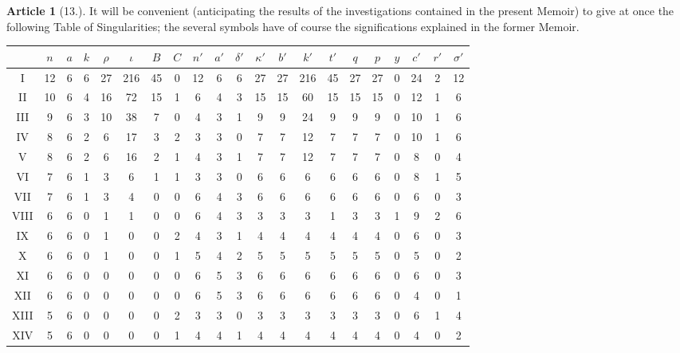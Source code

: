 \documentclass[11pt,a4paper]{article}
\theoremstyle{definition}
\newtheorem{art}{Article}
\begin{document}
\begin{art}[13.]
It will be convenient (anticipating the results of the investigations contained in the present Memoir) to give at once the following Table of Singularities; the several symbols have of course the significations explained in the former Memoir.

\begin{center}
\small
\begin{tabular}{|c|c|c|c|c|c|c|c|c|c|c|c|c|c|c|c|c|c|c|c|c|}
\hline
 & $n$ & $a$ & $k$ & $\rho$ & $\iota$ & $B$ & $C$ & $n'$ & $a'$ & $\delta'$ & $\kappa'$ & $b'$ & $k'$ & $t'$ & $q$ & $p$ & $y$ & $c'$ & $r'$ & $\sigma'$ \\
\hline
I & 12 & 6 & 6 & 27 & 216 & 45 & 0 & 12 & 6 & 6 & 27 & 27 & 216 & 45 & 27 & 27 & 0 & 24 & 2 & 12 \\
\hline
II & 10 & 6 & 4 & 16 & 72 & 15 & 1 & 6 & 4 & 3 & 15 & 15 & 60 & 15 & 15 & 15 & 0 & 12 & 1 & 6 \\
\hline
III & 9 & 6 & 3 & 10 & 38 & 7 & 0 & 4 & 3 & 1 & 9 & 9 & 24 & 9 & 9 & 9 & 0 & 10 & 1 & 6 \\
\hline
IV & 8 & 6 & 2 & 6 & 17 & 3 & 2 & 3 & 3 & 0 & 7 & 7 & 12 & 7 & 7 & 7 & 0 & 10 & 1 & 6 \\
\hline
V & 8 & 6 & 2 & 6 & 16 & 2 & 1 & 4 & 3 & 1 & 7 & 7 & 12 & 7 & 7 & 7 & 0 & 8 & 0 & 4 \\
\hline
VI & 7 & 6 & 1 & 3 & 6 & 1 & 1 & 3 & 3 & 0 & 6 & 6 & 6 & 6 & 6 & 6 & 0 & 8 & 1 & 5 \\
\hline
VII & 7 & 6 & 1 & 3 & 4 & 0 & 0 & 6 & 4 & 3 & 6 & 6 & 6 & 6 & 6 & 6 & 0 & 6 & 0 & 3 \\
\hline
VIII & 6 & 6 & 0 & 1 & 1 & 0 & 0 & 6 & 4 & 3 & 3 & 3 & 3 & 1 & 3 & 3 & 1 & 9 & 2 & 6 \\
\hline
IX & 6 & 6 & 0 & 1 & 0 & 0 & 2 & 4 & 3 & 1 & 4 & 4 & 4 & 4 & 4 & 4 & 0 & 6 & 0 & 3 \\
\hline
X & 6 & 6 & 0 & 1 & 0 & 0 & 1 & 5 & 4 & 2 & 5 & 5 & 5 & 5 & 5 & 5 & 0 & 5 & 0 & 2 \\
\hline
XI & 6 & 6 & 0 & 0 & 0 & 0 & 0 & 6 & 5 & 3 & 6 & 6 & 6 & 6 & 6 & 6 & 0 & 6 & 0 & 3 \\
\hline
XII & 6 & 6 & 0 & 0 & 0 & 0 & 0 & 6 & 5 & 3 & 6 & 6 & 6 & 6 & 6 & 6 & 0 & 4 & 0 & 1 \\
\hline
XIII & 5 & 6 & 0 & 0 & 0 & 0 & 2 & 3 & 3 & 0 & 3 & 3 & 3 & 3 & 3 & 3 & 0 & 6 & 1 & 4 \\
\hline
XIV & 5 & 6 & 0 & 0 & 0 & 0 & 1 & 4 & 4 & 1 & 4 & 4 & 4 & 4 & 4 & 4 & 0 & 4 & 0 & 2 \\

\end{tabular}
\end{center}
\end{art}
\end{document}
